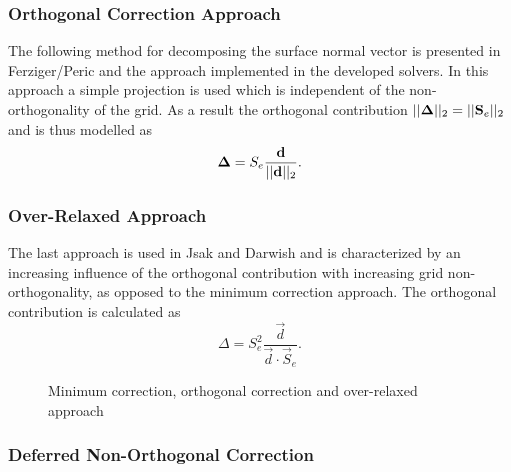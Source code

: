       \subsubsection{Orthogonal Correction Approach}
      \label{seq:orthcorrapproach}

      The following method for decomposing the surface normal vector is presented in Ferziger/Peric and the approach implemented in the developed solvers. In this approach a simple projection is used which is independent of the non-orthogonality of the grid. As a result the orthogonal contribution \(||\boldsymbol{\Delta}||_2 =  ||\mathbf{S}_e||_2\) and is thus modelled as 
      \begin{displaymath}
        \boldsymbol{\Delta} =  S_e \frac{\mathbf{d}}{ ||\mathbf{d}||_2}.
      \end{displaymath}

      \subsubsection{Over-Relaxed Approach}

      The last approach is used in Jsak and Darwish and is characterized by an increasing influence of the orthogonal contribution with increasing grid non-orthogonality, as opposed to the minimum correction approach. The orthogonal contribution is calculated as
      \begin{displaymath}
        \Delta =  S_e^2 \frac{\vec{d}}{ \vec{d} \cdot \vec{S}_e }.
      \end{displaymath} 

      \begin{figure}[h]
      \label{fig:nonorth}
      \qquad
      \caption{Minimum correction, orthogonal correction and over-relaxed approach}
      \end{figure}

      \subsubsection{Deferred Non-Orthogonal Correction}

